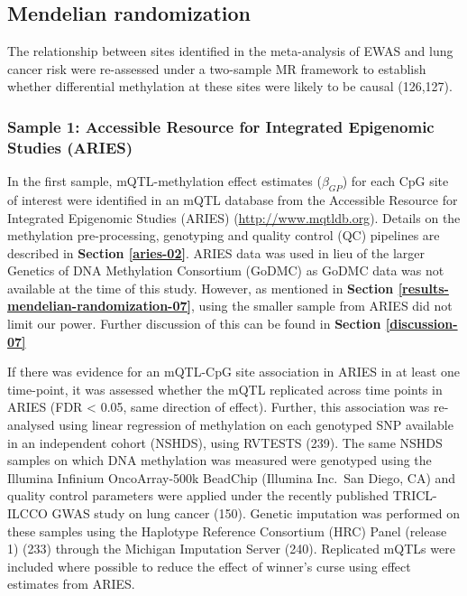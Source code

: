 \documentclass[11pt,twoside]{bristolthesis}
\begin{document}
\hypertarget{methods-mendelian-randomization-07}{%
\subsection{Mendelian randomization}\label{methods-mendelian-randomization-07}}

The relationship between sites identified in the meta-analysis of EWAS and lung cancer risk were re-assessed under a two-sample MR framework to establish whether differential methylation at these sites were likely to be causal (126,127).

\hypertarget{sample-1-accessible-resource-for-integrated-epigenomic-studies-aries}{%
\subsubsection{Sample 1: Accessible Resource for Integrated Epigenomic Studies (ARIES)}\label{sample-1-accessible-resource-for-integrated-epigenomic-studies-aries}}

In the first sample, mQTL-methylation effect estimates (\(\beta_{GP}\)) for each CpG site of interest were identified in an mQTL database from the Accessible Resource for Integrated Epigenomic Studies (ARIES) (\url{http://www.mqtldb.org}). Details on the methylation pre-processing, genotyping and quality control (QC) pipelines are described in \textbf{Section \ref{aries-02}}. ARIES data was used in lieu of the larger Genetics of DNA Methylation Consortium (GoDMC) as GoDMC data was not available at the time of this study. However, as mentioned in \textbf{Section \ref{results-mendelian-randomization-07}}, using the smaller sample from ARIES did not limit our power. Further discussion of this can be found in \textbf{Section \ref{discussion-07}}

If there was evidence for an mQTL-CpG site association in ARIES in at least one time-point, it was assessed whether the mQTL replicated across time points in ARIES (FDR \textless{} 0.05, same direction of effect). Further, this association was re-analysed using linear regression of methylation on each genotyped SNP available in an independent cohort (NSHDS), using RVTESTS (239). The same NSHDS samples on which DNA methylation was measured were genotyped using the Illumina Infinium OncoArray-500k BeadChip (Illumina Inc.~San Diego, CA) and quality control parameters were applied under the recently published TRICL-ILCCO GWAS study on lung cancer (150). Genetic imputation was performed on these samples using the Haplotype Reference Consortium (HRC) Panel (release 1) (233) through the Michigan Imputation Server (240). Replicated mQTLs were included where possible to reduce the effect of winner's curse using effect estimates from ARIES.
\end{document}

